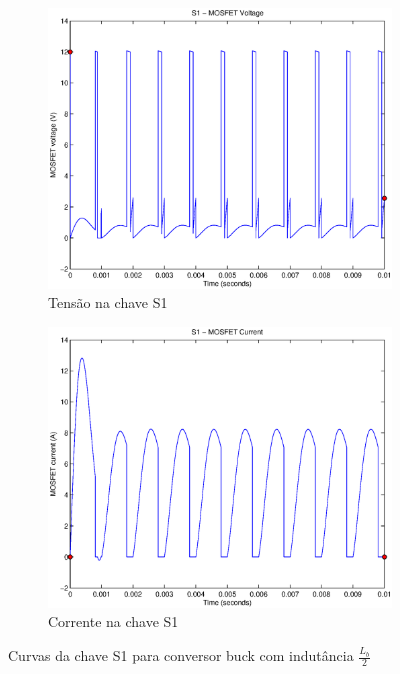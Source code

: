 \documentclass{article}
\begin{document}
\begin{figure}[H]
	\centering
	\begin{subfigure}[b]{0.4\linewidth}
		\includegraphics[width=\linewidth]{matlab/buck/r_s1v2}
		\caption{Tensão na chave S1}
	\end{subfigure}
	\begin{subfigure}[b]{0.4\linewidth}
		\centering
		\includegraphics[width=\linewidth]{matlab/buck/r_s1i2}
		\caption{Corrente na chave S1}
	\end{subfigure}
	\caption{Curvas da chave S1 para conversor buck com indutância $\frac{L_b}{2}$}
	\label{fig:bs12}
\end{figure}
\end{document}
